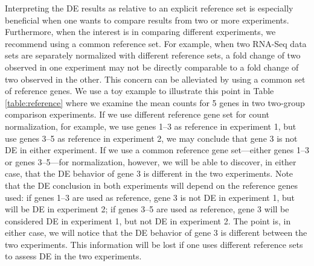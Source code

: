\documentclass[letterpaper,12pt]{article}
\begin{document}

Interpreting the DE results as relative to an explicit reference set is
especially beneficial when one wants to compare results from two or more
experiments. 
Furthermore, when the interest is in comparing different experiments, we recommend using a common reference set. 
For example, when two RNA-Seq data sets are separately
normalized with different reference sets, a fold change of two observed in one
experiment may not be directly comparable to a fold change of two observed in
the other.  This concern can be alleviated by using a common set of reference
genes.  We use a toy example to illustrate this point in Table
\ref{table:reference} where we examine the mean counts for 5 genes in two
two-group comparison experiments. If we use different reference gene set for
count normalization, for example, we use genes 1--3 as reference in experiment
1, but use genes 3--5 as reference in experiment 2, we may conclude that gene
3 is not DE in either experiment. If we use a common reference gene
set---either genes 1--3 or genes 3--5---for normalization, however, we will be
able to discover, in either case, that the DE behavior of gene 3 is different
in the two experiments. Note that the DE conclusion in both experiments will
depend on the reference genes used: if genes 1--3 are used as reference, gene
3 is not DE in experiment 1, but will be DE in experiment 2; if genes 3--5 are
used as reference, gene 3 will be considered DE in experiment 1, but not DE in
experiment 2. The point is, in either case, we will notice that the DE
behavior of gene 3 is different between the two experiments. This information
will be lost if one uses different reference sets to assess DE in the two
experiments.
\end{document}
